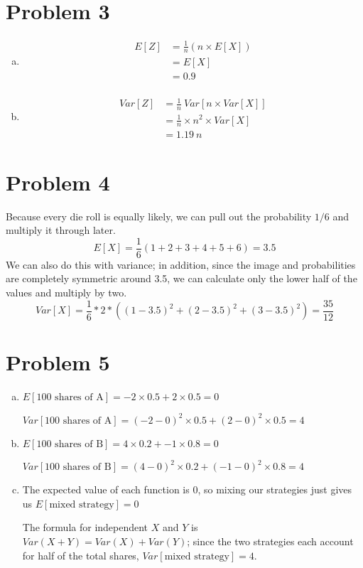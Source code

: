 \documentclass[11pt]{article}
\begin{document}
\section*{Problem 3}
\begin{enumerate}[(a)]
	\item
		\begin{align*}
			E[Z] &= \frac{1}{n} (n \times E[X]) \\
			&= E[X] \\
			&= 0.9 \\
		\end{align*}
	\item
		\begin{align*}
			Var[Z] &= \frac{1}{n}\ Var[n \times Var[X]] \\
			&= \frac{1}{n} \times n^2 \times Var[X] \\
			&= 1.19\ n
		\end{align*}
	
\end{enumerate}


\section*{Problem 4}
Because every die roll is equally likely, we can pull out the probability $1/6$ and multiply it through later.
	\[E[X] = \dfrac{1}{6}( 1+2+3+4+5+6) = 3.5 \]
We can also do this with variance; in addition, since the image and probabilities are completely symmetric around 3.5, we can calculate only the lower half of the values and multiply by two.
	\[Var[X] = \dfrac{1}{6} * 2 * ( (1-3.5)^2 + (2 - 3.5)^2 + (3-3.5)^2 ) = \dfrac{35}{12} \]
	
\section*{Problem 5}
\begin{enumerate}[(a)]
	\item 
	$E[\text{100 shares of A}] = -2 \times 0.5 + 2 \times 0.5 = 0$
	
	$Var[\text{100 shares of A} ] = (-2 -0)^2  \times 0.5 + (2-0)^2 \times 0.5 = 4$
	
	\item
	$E[\text{100 shares of B}] = 4 \times 0.2 + -1 \times 0.8 = 0$
	
	$Var[\text{100 shares of B}] = (4-0)^2 \times 0.2 + (-1 - 0)^2 \times 0.8 = 4$
	
	\item
	The expected value of each function is 0, so mixing our strategies just gives us $E[\text{mixed strategy}] = 0$
	
	The formula for independent $X$ and $Y$ is $Var(X+Y) = Var(X) +Var(Y)$; since the two strategies each account for half of the total shares, $Var[\text{mixed strategy}] = 4$.

\end{enumerate}
\end{document}
